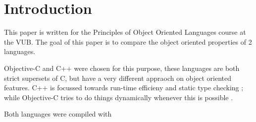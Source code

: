 \documentclass[11pt, a4paper, twocolumn]{article}
\begin{document}
\setlength{\parindent}{0pt}
\setlength{\parskip}{1ex}


\tableofcontents
\newpage

\section{Introduction}
This paper is written for the Principles of Object Oriented Languages course at the VUB. The goal of this paper is to compare the object oriented properties of 2 languages. 

Objective-C and C++ were chosen for this purpose, these languages are both strict supersets of C, but have a very different appraoch on object oriented features. C++ is focussed towards run-time efficieny and static type checking \cite{CPdesc}; while Objective-C tries to do things dynamically whenever this is possible \cite{OCRPG}.

Both languages were compiled with 





\printbibliography[heading = bibnumbered]


\end{document}
